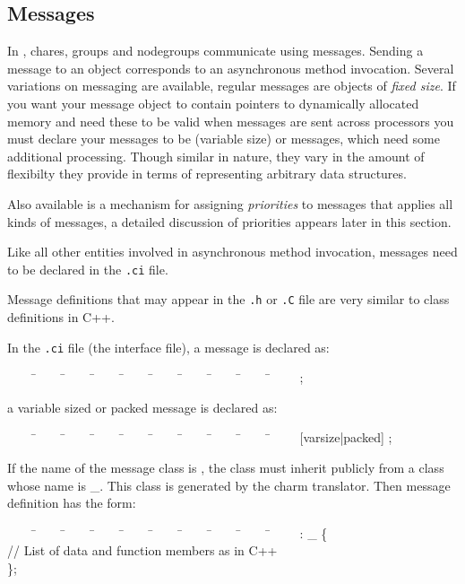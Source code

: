 \subsection{Messages}

In \charmpp, chares, groups and 
nodegroups communicate using 
messages. Sending a message  to an object corresponds to an 
asynchronous method invocation.
Several variations on messaging are available, regular \charmpp messages are 
objects of \textit{fixed size}. If you want your message object to contain 
pointers to dynamically allocated memory and need these to be valid when 
messages are sent across processors you must declare your messages to be 
 (variable size) or  messages, which need some 
additional processing. Though similar in nature, they vary in the amount 
of flexibilty they provide in terms of representing arbitrary data structures.
 
Also available is a mechanism for assigning \textit{priorities} to messages 
that applies all kinds of messages, a detailed discussion
of priorities appears later in this section.

Like all 
other entities involved in asynchronous method invocation, messages need to be
declared in the {\tt .ci} file.

Message definitions that may appear in the {\tt .h} or {\tt .C} file are very 
similar to class definitions in C++.

In the {\tt .ci} file (the interface file), a message is declared as: 

\begin{tabbing}
~~~~ \=~~~~ \=~~~~ \=~~~~ \=~~~~ \=~~~~ \=~~~~ \=~~~~ \=~~~~ \=~~~~ \kill
\>  ;
\end{tabbing}

a variable sized or packed message is declared as:

\begin{tabbing}
~~~~ \=~~~~ \=~~~~ \=~~~~ \=~~~~ \=~~~~ \=~~~~ \=~~~~ \=~~~~ \=~~~~ \kill
\>  [varsize|packed] ;
\end{tabbing}


If the name of the message class is , the class must inherit 
publicly from a class whose name is \_. This class
is generated by the charm translator. Then message definition has the form:

\begin{tabbing}
~~~~ \=~~~~ \=~~~~ \=~~~~ \=~~~~ \=~~~~ \=~~~~ \=~~~~ \=~~~~ \=~~~~ \kill
\>   : \_ \{ \\
\> \>  // List of data and function members as in C++ \\
\> \};
\end{tabbing}


